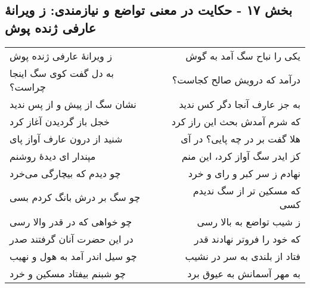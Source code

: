 \begin{center}
\section*{بخش ۱۷ - حکایت در معنی تواضع و نیازمندی: ز ویرانهٔ عارفی ژنده پوش}
\label{sec:017}
\begin{longtable}{l p{0.5cm} r}
ز ویرانهٔ عارفی ژنده پوش
&&
یکی را نباح سگ آمد به گوش
\\
به دل گفت کوی سگ اینجا چراست؟
&&
درآمد که درویش صالح کجاست؟
\\
نشان سگ از پیش و از پس ندید
&&
به جز عارف آنجا دگر کس ندید
\\
خجل باز گردیدن آغاز کرد
&&
که شرم آمدش بحث این راز کرد
\\
شنید از درون عارف آواز پای
&&
هلا گفت بر در چه پایی؟ در آی
\\
مپندار ای دیدهٔ روشنم
&&
کز ایدر سگ آواز کرد، این منم
\\
چو دیدم که بیچارگی می‌خرد
&&
نهادم ز سر کبر و رای و خرد
\\
چو سگ بر درش بانگ کردم بسی
&&
که مسکین تر از سگ ندیدم کسی
\\
چو خواهی که در قدر والا رسی
&&
ز شیب تواضع به بالا رسی
\\
در این حضرت آنان گرفتند صدر
&&
که خود را فروتر نهادند قدر
\\
چو سیل اندر آمد به هول و نهیب
&&
فتاد از بلندی به سر در نشیب
\\
چو شبنم بیفتاد مسکین و خرد
&&
به مهر آسمانش به عیوق برد
\\
\end{longtable}
\end{center}
